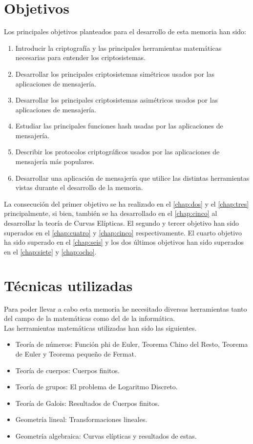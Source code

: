\section{Objetivos}
Los principales objetivos planteados para el desarrollo de esta memoria han sido:
\begin{enumerate}
	\item Introducir la criptografía y las principales herramientas matemáticas necesarias para entender los criptosistemas. 
	\item Desarrollar los principales criptosistemas simétricos usados por las aplicaciones de mensajería.
	\item Desarrollar los principales criptosistemas asimétricos usados por las aplicaciones de mensajería.
	\item Estudiar las principales funciones hash usadas por las aplicaciones de mensajería.
	\item Describir los protocolos criptográficos usados por las aplicaciones de mensajería más populares.
	\item Desarrollar una aplicación de mensajería que utilice las distintas herramientas vistas durante el desarrollo de la memoria.
\end{enumerate}

La consecución del primer objetivo se ha realizado en el \autoref{chap:dos} y el \autoref{chap:tres} principalmente, si bien, también se ha desarrollado en el \autoref{chap:cinco} al desarrollar la teoría de Curvas Elípticas. El segundo y tercer objetivo han sido superados en el \autoref{chap:cuatro} y \autoref{chap:cinco} respectivamente. El cuarto objetivo ha sido superado en el \autoref{chap:seis} y los dos últimos objetivos han sido superados en el \autoref{chap:siete} y \autoref{chap:ocho}.

\section{Técnicas utilizadas}
Para poder llevar a cabo esta memoria he necesitado diversas herramientas tanto del campo de la matemáticas como del de la informática.\\ 
Las herramientas matemáticas utilizadas han sido las siguientes.
\begin{itemize}
	\item Teoría de números: Función phi de Euler, Teorema Chino del Resto, Teorema de Euler y Teorema pequeño de Fermat.
	\item Teoría de cuerpos: Cuerpos finitos.
	\item Teoría de grupos: El problema de Logaritmo Discreto. 
	\item Teoría de Galois: Resultados de Cuerpos finitos.
	\item Geometría lineal: Transformaciones lineales.
	\item Geometría algebraica: Curvas elípticas y resultados de estas.
\end{itemize}


